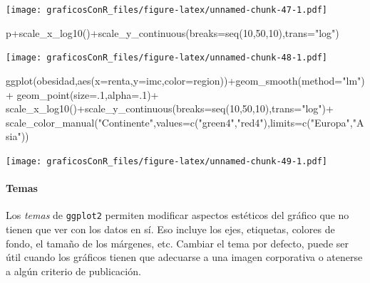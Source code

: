\documentclass[
]{article}
\newenvironment{Shaded}{\begin{snugshade}}{\end{snugshade}}
\newcommand{\AttributeTok}[1]{\textcolor[rgb]{0.77,0.63,0.00}{#1}}
\newcommand{\DecValTok}[1]{\textcolor[rgb]{0.00,0.00,0.81}{#1}}
\newcommand{\FunctionTok}[1]{\textcolor[rgb]{0.00,0.00,0.00}{#1}}
\newcommand{\NormalTok}[1]{#1}
\newcommand{\SpecialCharTok}[1]{\textcolor[rgb]{0.00,0.00,0.00}{#1}}
\newcommand{\StringTok}[1]{\textcolor[rgb]{0.31,0.60,0.02}{#1}}
\numberwithin{ejcnt}{section}
\begin{document}
\texttt{[image: graficosConR\_files/figure-latex/unnamed-chunk-47-1.pdf]}

\begin{Shaded}
\begin{Highlighting}[]
\NormalTok{p}\SpecialCharTok{+}\FunctionTok{scale\_x\_log10}\NormalTok{()}\SpecialCharTok{+}\FunctionTok{scale\_y\_continuous}\NormalTok{(}\AttributeTok{breaks=}\FunctionTok{seq}\NormalTok{(}\DecValTok{10}\NormalTok{,}\DecValTok{50}\NormalTok{,}\DecValTok{10}\NormalTok{),}\AttributeTok{trans=}\StringTok{"log"}\NormalTok{)}
\end{Highlighting}
\end{Shaded}

\texttt{[image: graficosConR\_files/figure-latex/unnamed-chunk-48-1.pdf]}

\begin{Shaded}
\begin{Highlighting}[]
\FunctionTok{ggplot}\NormalTok{(obesidad,}\FunctionTok{aes}\NormalTok{(}\AttributeTok{x=}\NormalTok{renta,}\AttributeTok{y=}\NormalTok{imc,}\AttributeTok{color=}\NormalTok{region))}\SpecialCharTok{+}\FunctionTok{geom\_smooth}\NormalTok{(}\AttributeTok{method=}\StringTok{"lm"}\NormalTok{) }\SpecialCharTok{+} 
  \FunctionTok{geom\_point}\NormalTok{(}\AttributeTok{size=}\NormalTok{.}\DecValTok{1}\NormalTok{,}\AttributeTok{alpha=}\NormalTok{.}\DecValTok{1}\NormalTok{)}\SpecialCharTok{+}
  \FunctionTok{scale\_x\_log10}\NormalTok{()}\SpecialCharTok{+}\FunctionTok{scale\_y\_continuous}\NormalTok{(}\AttributeTok{breaks=}\FunctionTok{seq}\NormalTok{(}\DecValTok{10}\NormalTok{,}\DecValTok{50}\NormalTok{,}\DecValTok{10}\NormalTok{),}\AttributeTok{trans=}\StringTok{"log"}\NormalTok{)}\SpecialCharTok{+}
  \FunctionTok{scale\_color\_manual}\NormalTok{(}\StringTok{"Continente"}\NormalTok{,}\AttributeTok{values=}\FunctionTok{c}\NormalTok{(}\StringTok{"green4"}\NormalTok{,}\StringTok{"red4"}\NormalTok{),}\AttributeTok{limits=}\FunctionTok{c}\NormalTok{(}\StringTok{"Europa"}\NormalTok{,}\StringTok{"Asia"}\NormalTok{))}
\end{Highlighting}
\end{Shaded}

\texttt{[image: graficosConR\_files/figure-latex/unnamed-chunk-49-1.pdf]}

\hypertarget{temas}{%
\paragraph{Temas}\label{temas}}

Los \emph{temas} de \texttt{ggplot2} permiten modificar aspectos estéticos del gráfico que no tienen que ver con los datos en sí. Eso incluye los ejes, etiquetas, colores de fondo, el tamaño de los márgenes, etc. Cambiar el tema por defecto, puede ser útil cuando los gráficos tienen que adecuarse a una imagen corporativa o atenerse a algún criterio de publicación.
\end{document}
